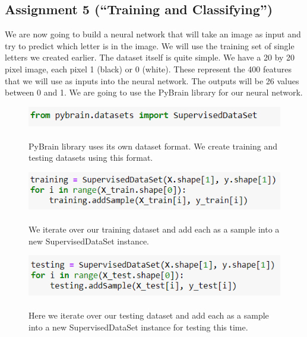 \documentclass[onecolumn]{article}
\begin{document}
\newpage
\subsection{Assignment 5 (``Training and Classifying'')}

\begin{t}
We are now going to build a neural network that will take an image as input and
try to predict which letter is in the image.
We will use the training set of single letters we created earlier. The dataset itself is
quite simple. We have a 20 by 20 pixel image, each pixel 1 (black) or 0 (white). These
represent the 400 features that we will use as inputs into the neural network. The
outputs will be 26 values between 0 and 1.
We are going to use the PyBrain library for our neural network.
\end{t}

\begin{figure}[hb!]
    \centering
    \includegraphics[width=.6\linewidth]{32..png}
\caption{\label{fig:demo-bad}
\centering
\\PyBrain library uses its own dataset format. We create training and testing datasets using this format.}
\end{figure}

\begin{figure}[h]
    \centering
    \includegraphics[width=.6\linewidth]{33..png}
\caption{\label{fig:demo-bad}
\centering
\\We iterate over our training dataset and add each as a sample into a new SupervisedDataSet instance.}
\end{figure}

\begin{figure}[h]
    \centering
    \includegraphics[width=.6\linewidth]{34..png}
\caption{\label{fig:demo-bad}
\centering
\\Here we iterate over our testing dataset and add each as a sample into a new
SupervisedDataSet instance for testing this time.}
\end{figure}
\end{document}
